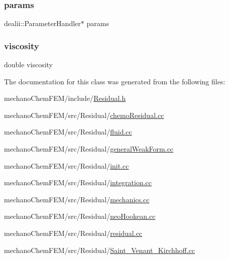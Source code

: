 \subsubsection{\texorpdfstring{params}{params}}
{\footnotesize\ttfamily dealii\+::\+Parameter\+Handler$\ast$ params}

\mbox{\label{class_residual_ad80875e5d1c4362e2eae93663ad723fb}} 
\subsubsection{\texorpdfstring{viscosity}{viscosity}}
{\footnotesize\ttfamily double viscosity}



The documentation for this class was generated from the following files\+:\begin{DoxyCompactItemize}
\item 
mechano\+Chem\+F\+E\+M/include/\mbox{\hyperlink{_residual_8h}{Residual.\+h}}\item 
mechano\+Chem\+F\+E\+M/src/\+Residual/\mbox{\hyperlink{chemo_residual_8cc}{chemo\+Residual.\+cc}}\item 
mechano\+Chem\+F\+E\+M/src/\+Residual/\mbox{\hyperlink{fluid_8cc}{fluid.\+cc}}\item 
mechano\+Chem\+F\+E\+M/src/\+Residual/\mbox{\hyperlink{general_weak_form_8cc}{general\+Weak\+Form.\+cc}}\item 
mechano\+Chem\+F\+E\+M/src/\+Residual/\mbox{\hyperlink{init_8cc}{init.\+cc}}\item 
mechano\+Chem\+F\+E\+M/src/\+Residual/\mbox{\hyperlink{integration_8cc}{integration.\+cc}}\item 
mechano\+Chem\+F\+E\+M/src/\+Residual/\mbox{\hyperlink{mechanics_8cc}{mechanics.\+cc}}\item 
mechano\+Chem\+F\+E\+M/src/\+Residual/\mbox{\hyperlink{neo_hookean_8cc}{neo\+Hookean.\+cc}}\item 
mechano\+Chem\+F\+E\+M/src/\+Residual/\mbox{\hyperlink{residual_8cc}{residual.\+cc}}\item 
mechano\+Chem\+F\+E\+M/src/\+Residual/\mbox{\hyperlink{_saint___venant___kirchhoff_8cc}{Saint\+\_\+\+Venant\+\_\+\+Kirchhoff.\+cc}}\end{DoxyCompactItemize}
